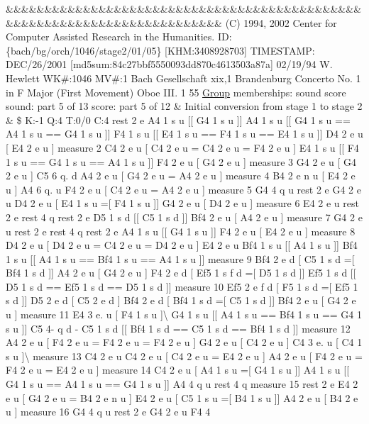 \&\&\&\&\&\&\&\&\&\&\&\&\&\&\&\&\&\&\&\&\&\&\&\&\&\&\&\&\&\&\&\&\&\&\&\&\&\&\&\&\&\&\&\&\&\&\&\&\&\&\&\&\&\&\&\&\&\&\&\&\&\&\&\&\&\&\&\&\&\&\&\&\&\& (C) 1994, 2002 Center for Computer Assisted Research in the Humanities. ID\+: \{bach/bg/orch/1046/stage2/01/05\} \mbox{[}K\+HM\+:3408928703\mbox{]} T\+I\+M\+E\+S\+T\+A\+MP\+: D\+E\+C/26/2001 \mbox{[}md5sum\+:84c27bbf5550093dd870c4613503a87a\mbox{]} 02/19/94 W. Hewlett WK\#\+:1046 MV\#\+:1 Bach Gesellschaft xix,1 Brandenburg Concerto No. 1 in F Major (First Movement) Oboe I\+II. 1 55 \hyperlink{class_group}{Group} memberships\+: sound score sound\+: part 5 of 13 score\+: part 5 of 12 \& Initial conversion from stage 1 to stage 2 \& \$ K\+:-\/1 Q\+:4 T\+:0/0 C\+:4 rest 2 e A4 1 s u \mbox{[}\mbox{[} G4 1 s u \mbox{]}\mbox{]} A4 1 s u \mbox{[}\mbox{[} G4 1 s u == A4 1 s u == G4 1 s u \mbox{]}\mbox{]} F4 1 s u \mbox{[}\mbox{[} E4 1 s u == F4 1 s u == E4 1 s u \mbox{]}\mbox{]} D4 2 e u \mbox{[} E4 2 e u \mbox{]} measure 2 C4 2 e u \mbox{[} C4 2 e u = C4 2 e u = F4 2 e u \mbox{]} E4 1 s u \mbox{[}\mbox{[} F4 1 s u == G4 1 s u == A4 1 s u \mbox{]}\mbox{]} F4 2 e u \mbox{[} G4 2 e u \mbox{]} measure 3 G4 2 e u \mbox{[} G4 2 e u \mbox{]} C5 6 q. d A4 2 e u \mbox{[} G4 2 e u = A4 2 e u \mbox{]} measure 4 B4 2 e n u \mbox{[} E4 2 e u \mbox{]} A4 6 q. u F4 2 e u \mbox{[} C4 2 e u = A4 2 e u \mbox{]} measure 5 G4 4 q u rest 2 e G4 2 e u D4 2 e u \mbox{[} E4 1 s u =\mbox{[} F4 1 s u \mbox{]}\mbox{]} G4 2 e u \mbox{[} D4 2 e u \mbox{]} measure 6 E4 2 e u rest 2 e rest 4 q rest 2 e D5 1 s d \mbox{[}\mbox{[} C5 1 s d \mbox{]}\mbox{]} Bf4 2 e u \mbox{[} A4 2 e u \mbox{]} measure 7 G4 2 e u rest 2 e rest 4 q rest 2 e A4 1 s u \mbox{[}\mbox{[} G4 1 s u \mbox{]}\mbox{]} F4 2 e u \mbox{[} E4 2 e u \mbox{]} measure 8 D4 2 e u \mbox{[} D4 2 e u = C4 2 e u = D4 2 e u \mbox{]} E4 2 e u Bf4 1 s u \mbox{[}\mbox{[} A4 1 s u \mbox{]}\mbox{]} Bf4 1 s u \mbox{[}\mbox{[} A4 1 s u == Bf4 1 s u == A4 1 s u \mbox{]}\mbox{]} measure 9 Bf4 2 e d \mbox{[} C5 1 s d =\mbox{[} Bf4 1 s d \mbox{]}\mbox{]} A4 2 e u \mbox{[} G4 2 e u \mbox{]} F4 2 e d \mbox{[} Ef5 1 s f d =\mbox{[} D5 1 s d \mbox{]}\mbox{]} Ef5 1 s d \mbox{[}\mbox{[} D5 1 s d == Ef5 1 s d == D5 1 s d \mbox{]}\mbox{]} measure 10 Ef5 2 e f d \mbox{[} F5 1 s d =\mbox{[} Ef5 1 s d \mbox{]}\mbox{]} D5 2 e d \mbox{[} C5 2 e d \mbox{]} Bf4 2 e d \mbox{[} Bf4 1 s d =\mbox{[} C5 1 s d \mbox{]}\mbox{]} Bf4 2 e u \mbox{[} G4 2 e u \mbox{]} measure 11 E4 3 e. u \mbox{[} F4 1 s u \mbox{]}\textbackslash{} G4 1 s u \mbox{[}\mbox{[} A4 1 s u == Bf4 1 s u == G4 1 s u \mbox{]}\mbox{]} C5 4-\/ q d -\/ C5 1 s d \mbox{[}\mbox{[} Bf4 1 s d == C5 1 s d == Bf4 1 s d \mbox{]}\mbox{]} measure 12 A4 2 e u \mbox{[} F4 2 e u = F4 2 e u = F4 2 e u \mbox{]} G4 2 e u \mbox{[} C4 2 e u \mbox{]} C4 3 e. u \mbox{[} C4 1 s u \mbox{]}\textbackslash{} measure 13 C4 2 e u C4 2 e u \mbox{[} C4 2 e u = E4 2 e u \mbox{]} A4 2 e u \mbox{[} F4 2 e u = F4 2 e u = E4 2 e u \mbox{]} measure 14 C4 2 e u \mbox{[} A4 1 s u =\mbox{[} G4 1 s u \mbox{]}\mbox{]} A4 1 s u \mbox{[}\mbox{[} G4 1 s u == A4 1 s u == G4 1 s u \mbox{]}\mbox{]} A4 4 q u rest 4 q measure 15 rest 2 e E4 2 e u \mbox{[} G4 2 e u = B4 2 e n u \mbox{]} E4 2 e u \mbox{[} C5 1 s u =\mbox{[} B4 1 s u \mbox{]}\mbox{]} A4 2 e u \mbox{[} B4 2 e u \mbox{]} measure 16 G4 4 q u rest 2 e G4 2 e u F4 4 